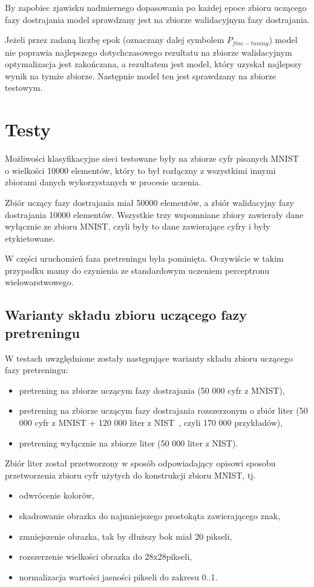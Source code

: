 \documentclass[fleqn]{scrartcl}
\begin{document}
By zapobiec zjawisku nadmiernego dopasowania po każdej epoce zbioru uczącego fazy dostrajania model sprawdzany jest na zbiorze walidacyjnym fazy dostrajania.

Jeżeli przez zadaną liczbę epok (oznaczany dalej symbolem $P_{fine-tuning}$)  model nie poprawia najlepszego dotychczasowego rezultatu na zbiorze walidacyjnym optymalizacja jest zakończana, a rezultatem jest model, który uzyskał najlepszy wynik na tymże zbiorze. Następnie model ten jest sprawdzany na zbiorze testowym.






\section{Testy}
Możliwości klasyfikacyjne sieci testowane były na zbiorze cyfr pisanych MNIST~\cite{cite:MNIST} o wielkości 10000 elementów, który to był rozłączny z wszystkimi innymi zbiorami danych wykorzystanych w procesie uczenia. 

Zbiór uczący fazy dostrajania miał 50000 elementów, a zbiór walidacyjny fazy dostrajania 10000 elementów. Wszystkie trzy wspomniane zbiory zawierały dane wyłącznie ze zbioru MNIST, czyli były to dane zawierające cyfry i były etykietowane.

W części uruchomień faza pretreningu była pominięta.
Oczywiście w takim przypadku mamy do czynienia ze standardowym uczeniem perceptronu wielowarstwowego.

\subsection{Warianty składu zbioru uczącego fazy pretreningu}
W testach uwzględnione zostały następujące warianty składu zbioru uczącego fazy pretreningu:


\begin{itemize}
    \item pretrening na zbiorze uczącym fazy dostrajania (50 000 cyfr z MNIST),
    \item pretrening na zbiorze uczącym fazy dostrajania rozszerzonym o zbiór liter (50 000 cyfr z MNIST + 120 000 liter z NIST~\cite{cite:NIST}, czyli 170 000 przykładów),
    \item pretrening wyłącznie na zbiorze liter (50 000 liter z NIST).
\end{itemize}

Zbiór liter został przetworzony w sposób odpowiadający opisowi sposobu przetworzenia zbioru cyfr użytych do konstrukcji zbioru MNIST, tj. 
\begin{itemize}
    \item odwrócenie kolorów,
    \item skadrowanie obrazka do najmniejszego prostokąta zawierającego znak,
    \item zmniejszenie obrazka, tak by dłuższy bok miał 20 pikseli,
    \item rozszerzenie wielkości obrazka do 28x28pikseli,
    \item normalizacja wartości jasności pikseli do zakresu 0..1.
\end{itemize}
\end{document}
